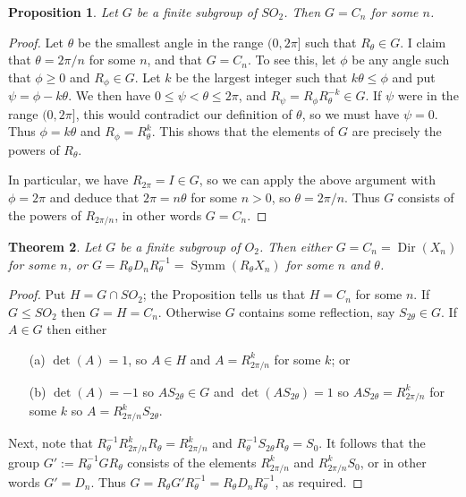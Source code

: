 \documentclass{amsart}
\DeclareMathOperator{\Dir}      {Dir}
\DeclareMathOperator{\Symm}     {Symm}
\renewcommand{\:}{\colon}
\newtheorem{theorem}{Theorem}[section]
\newtheorem{proposition}[theorem]{Proposition}
\theoremstyle{definition}
\begin{document}
\begin{proposition}\label{prop-SO-two-subgroups}
 Let $G$ be a finite subgroup of $SO_2$.  Then $G=C_n$ for some $n$.
\end{proposition}
\begin{proof}
 Let $\theta$ be the smallest angle in the range $(0,2\pi]$ such that
 $R_\theta\in G$.  I claim that $\theta=2\pi/n$ for some $n$, and that
 $G=C_n$.  To see this, let $\phi$ be any angle such that $\phi\geq 0$
 and $R_\phi\in G$.  Let $k$ be the largest integer such that
 $k\theta\leq\phi$ and put $\psi=\phi-k\theta$.  We then have
 $0\leq\psi<\theta\leq 2\pi$, and $R_\psi=R_\phi R_\theta^{-k}\in G$.
 If $\psi$ were in the range $(0,2\pi]$, this would contradict our
 definition of $\theta$, so we must have $\psi=0$.  Thus
 $\phi=k\theta$ and $R_\phi=R_\theta^k$.  This shows that the elements
 of $G$ are precisely the powers of $R_\theta$.

 In particular, we have $R_{2\pi}=I\in G$, so we can apply the above
 argument with $\phi=2\pi$ and deduce that $2\pi=n\theta$ for some
 $n>0$, so $\theta=2\pi/n$.  Thus $G$ consists of the powers of
 $R_{2\pi/n}$, in other words $G=C_n$.
\end{proof}


\begin{theorem}\label{thm-O-two-subgroups}
 Let $G$ be a finite subgroup of $O_2$.  Then either $G=C_n=\Dir(X_n)$
 for some $n$, or $G=R_\theta D_n R_\theta^{-1}=\Symm(R_\theta X_n)$ for
 some $n$ and $\theta$.
\end{theorem}
\begin{proof}
 Put $H=G\cap SO_2$; the Proposition tells us that $H=C_n$ for some
 $n$.  If $G\leq SO_2$ then $G=H=C_n$.  Otherwise $G$ contains some
 reflection, say $S_{2\theta}\in G$.  If $A\in G$ then either
 \begin{itemize}
  \item[(a)] $\det(A)=1$, so $A\in H$ and $A=R_{2\pi/n}^k$ for some
   $k$; or
  \item[(b)] $\det(A)=-1$ so $AS_{2\theta}\in G$ and
   $\det(AS_{2\theta})=1$ so $AS_{2\theta}=R_{2\pi/n}^k$ for some $k$ so
   $A=R_{2\pi/n}^kS_{2\theta}$.
 \end{itemize}
 Next, note that $R_\theta^{-1}R_{2\pi/n}^kR_\theta=R_{2\pi/n}^k$ and
 $R_\theta^{-1}S_{2\theta}R_\theta=S_0$.  It follows that the group
 $G':=R_\theta^{-1}GR_\theta$ consists of the elements $R_{2\pi/n}^k$ and
 $R_{2\pi/n}^kS_0$, or in other words $G'=D_n$.  Thus
 $G=R_\theta G'R_\theta^{-1}=R_\theta D_n R_\theta^{-1}$, as required.
\end{proof}
\end{document}
